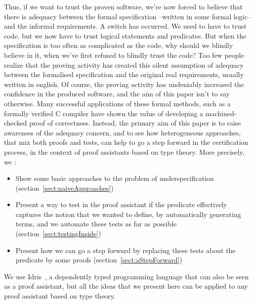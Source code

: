 Thus, if we want to trust the proven software, we're now forced to believe that there is adequacy between the formal specification --written in some formal logic-- and the informal requirements. A switch has occurred. We used to have to trust code, but we now have to trust logical statements and predicates. But when the specification is too often as complicated as the code, why should we blindly believe in it, when we've first refused to blindly trust the code? Too few people realize that the proving activity has created this silent assumption of adequacy between the formalised specification and the original real requirements, usually written in english. Of course, the proving activity has undeniably increased the confidence in the produced software, and the aim of this paper isn't to say otherwise. Many successful applications of these formal methods, such as a formally verified C compiler \cite{Leroy09} have shown the value of developing a machined-checked proof of correctness. Instead, the primary aim of this paper is to raise awareness of the adequacy concern, and to see how heterogeneous approaches, that mix both proofs and tests, can help to go a step forward in the certification process, in the context of proof assistants based on type theory.
More precisely, we :
\begin{itemize}
	\item Show some basic approaches to the problem of underspecification (section~\ref{sect:naiveApproaches})
	\item Present a way to test in the proof assistant if the predicate effectively captures the notion that we wanted to define, by automatically generating terms, and we automate these tests as far as possible (section~\ref{sect:testingInside})
	\item Present how we can go a step forward by replacing these tests about the predicate by some proofs (section~\ref{sect:aStepForward})
\end{itemize}

We use Idris~\cite{brady2013idris}, a dependently typed programming language that can also be seen as a proof assistant, but all the ideas that we present here can be applied to any proof assistant based on type theory.

